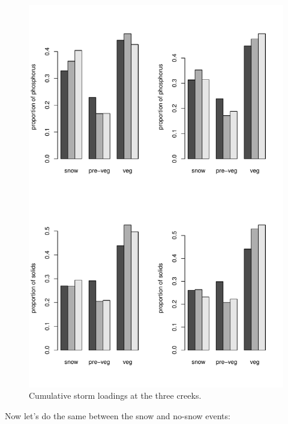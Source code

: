 \documentclass[12pt]{article}
\begin{document}
\begin{figure}
    \begin{center}
\includegraphics{loadings-fig2}
    \end{center}
    \caption{Cumulative storm loadings at the three creeks.\label{bars}}
\end{figure}



Now let's do the same between the snow and no-snow events:\\
\end{document}
